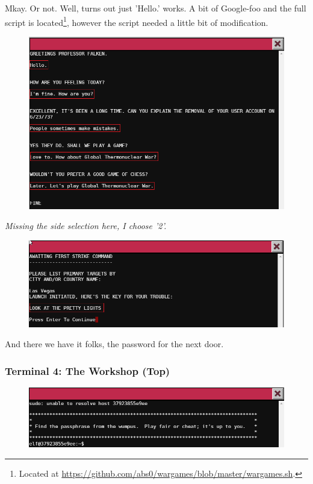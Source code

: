 \documentclass[writeup.tex]{subfiles}
\begin{document}
			Mkay. Or not. Well, turns out just 'Hello.' works. A bit of Google-foo and the full script is located\footnote{Located at \url{https://github.com/abs0/wargames/blob/master/wargames.sh}.}, however the script needed a little bit of modification.
			
			\begin{figure}[H]
				\centering
				\includegraphics[width=\linewidth]{"screenshots/terminals/Terminal 3 - First full"}
			\end{figure}
			\textit{Missing the side selection here, I choose '2'.}
			\begin{figure}[H]
				\centering
				\includegraphics[width=\linewidth]{"screenshots/terminals/Terminal 3 - Final"}
			\end{figure}
			
			And there we have it folks, the password for the next door.
			
			

		\subsubsection{Terminal 4: The Workshop (Top)} \label{terminal4}
			\begin{figure}[H]
				\centering
				\includegraphics[width=\linewidth]{"screenshots/terminals/Terminal 4 - First"}
			\end{figure}
			
\end{document}
